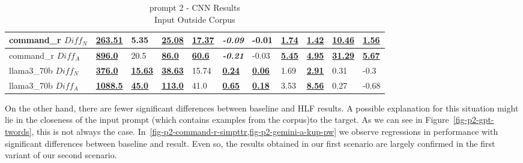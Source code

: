 \documentclass[11pt]{article}
\begin{document}
\begin{table}[ht!]
{\begin{tabular}{lllllllllll}
            command\_r $Diff_N$  & \textbf{\underline{263.51}}  & 5.35                       & \textbf{\underline{25.08}}  & \textbf{\underline{17.37}} & \textbf{\textit{-0.09}}   & -0.01                     & \textbf{\underline{1.74}} & \textbf{\underline{1.42}} & \textbf{\underline{10.46}} & \textbf{\underline{1.56}} \\ \midrule
            command\_r $Diff_A$  & \textbf{\underline{896.0}}   & 20.5                       & \textbf{\underline{86.0}}   & \textbf{\underline{60.6}}  & \textbf{\textit{-0.21}}   & -0.03                     & \textbf{\underline{5.45}} & \textbf{\underline{4.95}} & \textbf{\underline{31.29}} & \textbf{\underline{5.67}} \\ \midrule
            llama3\_70b $Diff_N$ & \textbf{\underline{376.0}}   & \textbf{\underline{15.63}} & \textbf{\underline{38.63}}  & 15.74                      & \textbf{\underline{0.24}} & \textbf{\underline{0.06}} & 1.69                      & \textbf{\underline{2.91}} & 0.31                       & -0.3                      \\ \midrule
            llama3\_70b $Diff_A$ & \textbf{\underline{1088.5}}  & \textbf{\underline{45.0}}  & \textbf{\underline{113.0}}  & 41.0                       & \textbf{\underline{0.65}} & \textbf{\underline{0.18}} & 3.53                      & \textbf{\underline{8.56}} & 0.27                       & -0.68                     \\ \bottomrule
        \end{tabular}%
    }
    \caption{prompt 2 - CNN Results\\Input Outside Corpus}\label{table-prompt-2-cnn-dailymail} %
\end{table}

On the other hand, there are fewer significant differences between baseline and
HLF results.
A possible explanation for this situation might lie in the closeness of the
input prompt (which contains examples from the corpus)to the target.
As we can see in Figure~\ref{fig-p2-gpt-twords}, this is not always the case.
In~\cref{fig-p2-command-r-simpttr,fig-p2-gemini-a-kup-pw} we observe regressions
in performance with significant differences between baseline and result.
Even so, the results obtained in our first scenario are largely confirmed in the
first variant of our second scenario.
\end{document}
